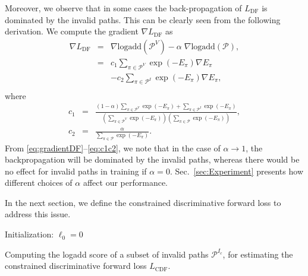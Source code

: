 \documentclass[10pt,twocolumn,letterpaper]{article}
\begin{document}
Moreover, we observe that in some cases the back-propagation of $L_\text{DF}$ is dominated by the invalid paths. This can be clearly seen from the following derivation. We compute the gradient $\nabla  L_\text{DF}$  as
\begin{equation}
\begin{array}{lcl}
\nabla  L_\text{DF} &=& \nabla \text{logadd}(\mathcal{P}^V) -\alpha\; \nabla\text{logadd}(\mathcal{P}),  \\

                    &=&  c_1\sum_{\pi\in\mathcal{P}^V}\exp(-E_{\pi})\nabla E_{\pi} \\
                    &&- c_2\sum_{\pi\in\mathcal{P}^I}\exp(-E_{\pi})\nabla E_{\pi},\\
\end{array}
\label{eq:gradientDF}
\end{equation}
where
\begin{equation}
\begin{array}{lcl}
c_1 &=& \frac{(1-\alpha)\sum_{\pi\in\mathcal{P}^V} \exp(-E_{\pi})+\sum_{\pi\in\mathcal{P}^I} \exp(-E_{\pi})}{(\sum_{\pi\in\mathcal{P}^V} \exp(-E_{\pi}))(\sum_{\pi\in\mathcal{P}} \exp(-E_{\pi})) },\\
                    c_2&=&\frac{\alpha}{\sum_{\pi\in\mathcal{P}} \exp(-E_{\pi})}.
\end{array}
\label{eq:c1c2}
\end{equation}
From \eqref{eq:gradientDF}--\eqref{eq:c1c2}, we note that in the case of $\alpha \to 1$, the backpropagation will be dominated by the invalid paths, whereas there would be no effect for invalid paths in training if $\alpha = 0$. Sec.~\ref{sec:Experiment} presents how different choices of $\alpha$ affect our performance.

In the next section, we define the constrained discriminative forward loss to address this issue.


\begin{algorithm}[t]
\SetAlgoLined
{}
Initialization: $\ell_0 = 0$ \;
\caption{Computing the logadd score of a subset of invalid paths $\mathcal{P}^{I_c}$, for estimating the constrained discriminative forward loss $L_\text{CDF}$.}
\label{alg:CDF}
\end{algorithm}
\end{document}
